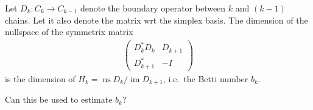 \documentclass[12pt]{article}
\begin{document}
Let $D_k : C_k \to C_{k-1}$ denote the boundary operator
between $k$ and $(k-1)$ chains.
%
Let it also denote the matrix wrt the simplex basis.
%
The dimension of the nullspace of the symmetrix matrix
\begin{align}
	\begin{pmatrix}
		D_k^* D_k  &  D_{k+1}
		\\
		D_{k+1}^*  &  -I
	\end{pmatrix}
\end{align}
is the dimension of $H_k = \operatorname{ns} D_k / \operatorname{im} D_{k+1}$,
i.e.~the Betti number $b_k$.

\vspace{2\baselineskip}

Can this be used to estimate $b_k$?
\end{document}
